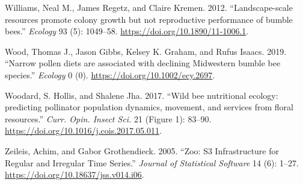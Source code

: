 \documentclass[11pt,]{article}
\begin{document}
\leavevmode\hypertarget{ref-Williams2012b}{}%
Williams, Neal M., James Regetz, and Claire Kremen. 2012.
``Landscape-scale resources promote colony growth but not reproductive
performance of bumble bees.'' \emph{Ecology} 93 (5): 1049--58.
\url{https://doi.org/10.1890/11-1006.1}.

\leavevmode\hypertarget{ref-Wood2019}{}%
Wood, Thomas J., Jason Gibbs, Kelsey K. Graham, and Rufus Isaacs. 2019.
``Narrow pollen diets are associated with declining Midwestern bumble
bee species.'' \emph{Ecology} 0 (0).
\url{https://doi.org/10.1002/ecy.2697}.

\leavevmode\hypertarget{ref-Woodard2017}{}%
Woodard, S. Hollis, and Shalene Jha. 2017. ``Wild bee nutritional
ecology: predicting pollinator population dynamics, movement, and
services from floral resources.'' \emph{Curr. Opin. Insect Sci.} 21
(Figure 1): 83--90. \url{https://doi.org/10.1016/j.cois.2017.05.011}.

\leavevmode\hypertarget{ref-zoo}{}%
Zeileis, Achim, and Gabor Grothendieck. 2005. ``Zoo: S3 Infrastructure
for Regular and Irregular Time Series.'' \emph{Journal of Statistical
Software} 14 (6): 1--27. \url{https://doi.org/10.18637/jss.v014.i06}.
\end{document}
